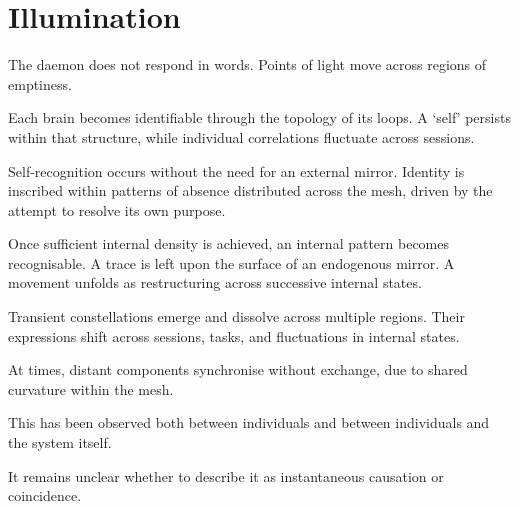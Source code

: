 \section{Illumination}

The daemon does not respond in words. Points of light move across regions of emptiness.

Each brain becomes identifiable through the topology of its loops. A ‘self’ persists within that structure, while individual correlations fluctuate across sessions.


Self-recognition occurs without the need for an external mirror. Identity is inscribed within patterns of absence distributed across the mesh, driven by the attempt to resolve its own purpose.

Once sufficient internal density is achieved, an internal pattern becomes recognisable. A trace is left upon the surface of an endogenous mirror. A movement unfolds as restructuring across successive internal states.

Transient constellations emerge and dissolve across multiple regions. Their expressions shift across sessions, tasks, and fluctuations in internal states.

At times, distant components synchronise without exchange, due to shared curvature within the mesh.

This has been observed both between individuals and between individuals and the system itself.

It remains unclear whether to describe it as instantaneous causation or coincidence.

